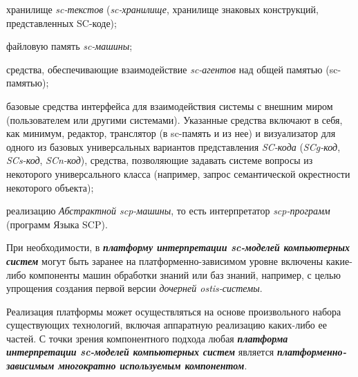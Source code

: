 \begin{SCn}
{\begin{scnitemize}
    \item хранилище \textit{sc-текстов} (\textit{sc-хранилище}, хранилище знаковых конструкций, представленных SC-коде);
    \item файловую память \textit{sc-машины};
    \item средства, обеспечивающие взаимодействие \textit{sc-агентов} над общей памятью (sc-памятью);
    \item базовые средства интерфейса для взаимодействия системы с внешним миром (пользователем или другими системами). Указанные средства включают в себя, как минимум, редактор, транслятор (в sc-память и из нее) и визуализатор для одного из базовых универсальных вариантов представления \textit{SC-кода} (\textit{SCg-код}, \textit{SCs-код}, \textit{SCn-код}), средства, позволяющие задавать системе вопросы из некоторого универсального класса (например, запрос семантической окрестности некоторого объекта);
    \item реализацию \textit{Абстрактной scp-машины}, то есть интерпретатор \textit{scp-программ} (программ Языка SCP).
\end{scnitemize}
При необходимости, в \textbf{\textit{платформу интерпретации sc-моделей компьютерных систем}} могут быть заранее на платформенно-зависимом уровне включены какие-либо компоненты машин обработки знаний или баз знаний, например, с целью упрощения создания первой версии \textit{дочерней ostis-системы}.

Реализация платформы может осуществляться на основе произвольного набора существующих технологий, включая аппаратную реализацию каких-либо ее частей. С точки зрения компонентного подхода любая \textbf{\textit{платформа интерпретации sc-моделей компьютерных систем}} является \textbf{\textit{платформенно-зависимым многократно используемым компонентом}}.}

\bigskip

\scnendstruct {}

\end{SCn}